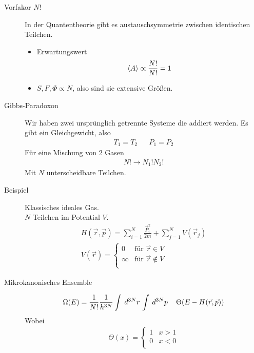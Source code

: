 \begin{description}
  \item[Vorfakor $N!$] 
    In der Quantentheorie gibt es austauschsymmetrie zwischen identischen
    Teilchen.
    \begin{itemize}
      \item Erwartungswert
        \begin{align*}
          \Braket{A} \propto \frac{N!}{N!} = 1
        \end{align*}
      \item $S, F, \Phi \propto N$, also sind sie extensive Gr\"o\ss{}en.
    \end{itemize}
  \item[Gibbs-Paradoxon]
    Wir haben zwei urspr\"unglich getrennte Systeme die addiert werden.
    Es gibt ein Gleichgewicht, also 
    \begin{align*}
      T_1 = T_2 && P_1 = P_2
    \end{align*}
    F\"ur eine Mischung von 2 Gasen 
    \begin{align*}
      N! \to N_1! N_2!
    \end{align*}
    Mit $N$ unterscheidbare Teilchen.
  \item [Beispiel] Klassisches ideales Gas. \\
    $N$ Teilchen im Potential $V$.
    \begin{align*}
      H(\vec{r}, \vec{p}) = \sum_{i=1}^{ N} \frac{\vec{P}_i ^2}{ 2m}
      + \sum_{j = 1}^{ N} V(\vec{r}_j) \\
      V(\vec{r}) = 
      \begin{cases}
        0 & \text{f\"ur } \vec{r} \in V \\
        \infty & \text{f\"ur } \vec{r} \not\in V \\
      \end{cases}
    \end{align*}
%
    \item[Mikrokanonisches Ensemble]
      \begin{align*}
        \Omega(E) = \frac{1}{N!} \frac{1}{h^{3N}} \int_{}^{} \,d^{3N} r\,
        \int_{}^{} \,d^{3N} p\, \quad \Theta(E - H(\vec{r}, \vec{p}))
      \end{align*}
      Wobei
      \begin{align*}
        \Theta(x) = \begin{cases}
          1 & x>1 \\
          0 & x <0 \\

\end{cases}
\end{align*}
\end{description}
